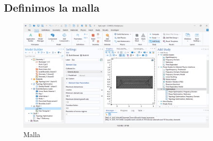 \documentclass{article}
\theoremstyle{mytheoremstyle}
\theoremstyle{mytheoremstyle}
\theoremstyle{myproblemstyle}
\begin{document}
\subsection{Definimos la malla}
             \begin{figure}[H]
              \centering
              \includegraphics[width=0.9\textwidth]{malla.png}
              \caption{Malla}
              \label{fig:comsol_malla}
            \end{figure}
\end{document}
